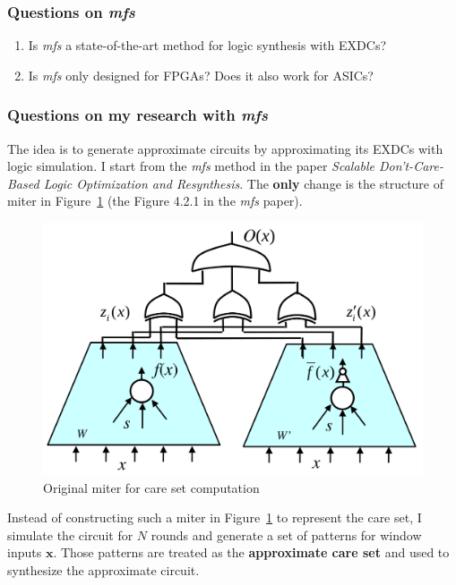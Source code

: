 \documentclass{rpt}
\begin{document}
\subsubsection*{Questions on \textit{mfs}}

\begin{enumerate}
\item Is \textit{mfs} a state-of-the-art method for logic synthesis with EXDCs?
\item Is \textit{mfs} only designed for FPGAs? Does it also work for ASICs?
\end{enumerate}

\subsubsection*{Questions on my research with \textit{mfs}}

The idea is to generate approximate circuits by approximating its EXDCs with logic simulation.
I start from the \textit{mfs} method in the paper \textit{Scalable Don't-Care-Based Logic Optimization and Resynthesis}.
The {\bf only} change is the structure of miter in Figure~\ref{fig:ori} (the Figure 4.2.1 in the \textit{mfs} paper).

\begin{figure}[!htbp]
\centering
\includegraphics[scale = 0.2]{./sat.png}
\caption{Original miter for care set computation}\label{fig:ori}
\end{figure}

Instead of constructing such a miter in Figure~\ref{fig:ori} to represent the care set,
I simulate the circuit for $N$ rounds and generate a set of patterns for window inputs $\mathbf{x}$.
Those patterns are treated as the {\bf approximate care set} and used to synthesize the approximate circuit.
\end{document}
